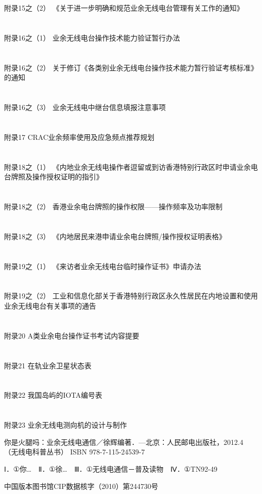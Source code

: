 \documentclass[12pt,UTF8]{ctexbook}
\begin{document}
\section{}附录15之（2） 《关于进一步明确和规范业余无线电台管理有关工作的通知》
\section{}附录16之（1） 业余无线电台操作技术能力验证暂行办法
\section{}附录16之（2） 关于修订《各类别业余无线电台操作技术能力暂行验证考核标准》的通知
\section{}附录16之（3） 业余无线电中继台信息填报注意事项
\section{}附录17 CRAC业余频率使用及应急频点推荐规划
\section{}附录18之（1） 《内地业余无线电操作者逗留或到访香港特别行政区时申请业余电台牌照及操作授权证明的指引》
\section{}附录18之（2） 香港业余电台牌照的操作权限——操作频率及功率限制
\section{}附录18之（3） 《内地居民来港申请业余电台牌照/操作授权证明表格》
\section{}附录19之（1） 《来访者业余无线电台临时操作证书》申请办法
\section{}附录19之（2） 工业和信息化部关于香港特别行政区永久性居民在内地设置和使用业余无线电台有关事项的通告
\section{}附录20 A类业余电台操作证书考试内容提要
\section{}附录21 在轨业余卫星状态表
\section{}附录22 我国岛屿的IOTA编号表
\section{}附录23 业余无线电测向机的设计与制作


你是火腿吗：业余无线电通信／徐辉编著．—北京：人民邮电出版社，2012.4
（无线电科普丛书）
ISBN 978-7-115-24539-7

Ⅰ．①你…　Ⅱ．①徐…　Ⅲ．①无线电通信－普及读物　Ⅳ．①TN92-49

中国版本图书馆CIP数据核字（2010）第244730号
\end{document}
